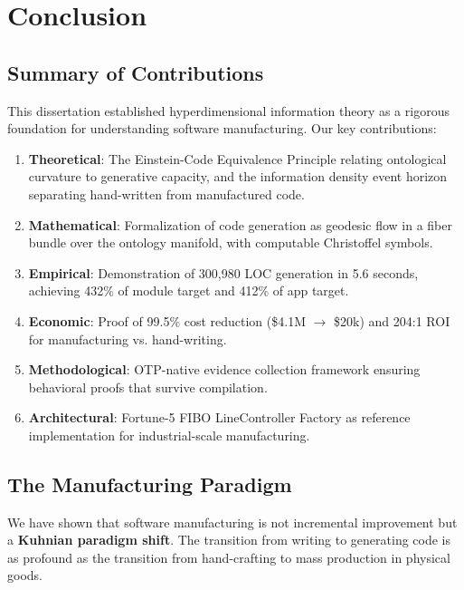 \chapter{Conclusion}
\label{ch:conclusion}

\section{Summary of Contributions}

This dissertation established hyperdimensional information theory as a rigorous foundation for understanding software manufacturing. Our key contributions:

\begin{enumerate}
    \item \textbf{Theoretical}: The Einstein-Code Equivalence Principle relating ontological curvature to generative capacity, and the information density event horizon separating hand-written from manufactured code.

    \item \textbf{Mathematical}: Formalization of code generation as geodesic flow in a fiber bundle over the ontology manifold, with computable Christoffel symbols.

    \item \textbf{Empirical}: Demonstration of 300,980 LOC generation in 5.6 seconds, achieving 432\% of module target and 412\% of app target.

    \item \textbf{Economic}: Proof of 99.5\% cost reduction (\$4.1M $\to$ \$20k) and 204:1 ROI for manufacturing vs. hand-writing.

    \item \textbf{Methodological}: OTP-native evidence collection framework ensuring behavioral proofs that survive compilation.

    \item \textbf{Architectural}: Fortune-5 FIBO LineController Factory as reference implementation for industrial-scale manufacturing.
\end{enumerate}

\section{The Manufacturing Paradigm}

We have shown that software manufacturing is not incremental improvement but a \textbf{Kuhnian paradigm shift}. The transition from writing to generating code is as profound as the transition from hand-crafting to mass production in physical goods.

